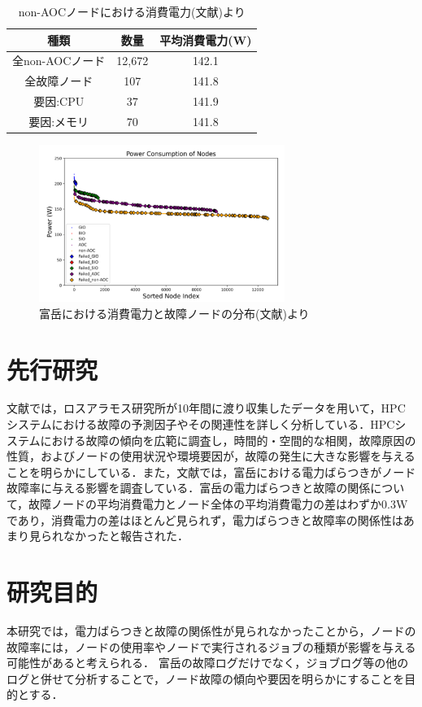 \documentclass[a4paper,11pt,twocolumn]{jsarticle}
\begin{document}
\begin{table}[h]
  \centering
  \caption{non-AOCノードにおける消費電力(文献\cite{master_kusaba})より}
  \label{tab:power}
  \begin{tabular}{c|cc}
    \hline
    種類 & 数量 & 平均消費電力(W) \\
    \hline 
    \hline
    全non-AOCノード & 12,672 & 142.1  \\
    全故障ノード & 107 & 141.8  \\
    \hline
    要因:CPU & 37 & 141.9 \\
    要因:メモリ & 70 & 141.8 \\
    \hline
  \end{tabular}
\end{table}

\begin{figure}[t]
  \centering
  \includegraphics[width=8cm]{figure/Fugakufail.pdf}
  \caption{富岳における消費電力と故障ノードの分布(文献\cite{master_kusaba})より}
  \label{fig:Fugakufail}
\end{figure}

\section{先行研究}
文献\cite{HPC_system_fail}では，ロスアラモス研究所が10年間に渡り収集したデータを用いて，HPCシステムにおける故障の予測因子やその関連性を詳しく分析している．HPCシステムにおける故障の傾向を広範に調査し，時間的・空間的な相関，故障原因の性質，およびノードの使用状況や環境要因が，故障の発生に大きな影響を与えることを明らかにしている．また，文献\cite{master_kusaba}では，富岳における電力ばらつきがノード故障率に与える影響を調査している．富岳の電力ばらつきと故障の関係について，故障ノードの平均消費電力とノード全体の平均消費電力の差はわずか0.3Wであり，消費電力の差はほとんど見られず，電力ばらつきと故障率の関係性はあまり見られなかったと報告された．

\section{研究目的}
本研究では，電力ばらつきと故障の関係性が見られなかったことから，ノードの故障率には，ノードの使用率やノードで実行されるジョブの種類が影響を与える可能性があると考えられる．
富岳の故障ログだけでなく，ジョブログ等の他のログと併せて分析することで，ノード故障の傾向や要因を明らかにすることを目的とする．
\end{document}
